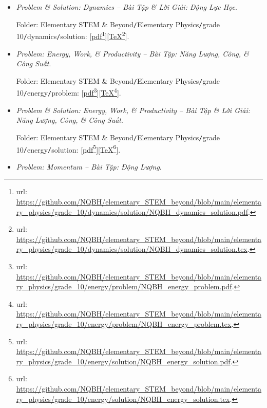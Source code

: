 \documentclass[12pt]{article}
\begin{document}
\begin{itemize}
	\item {\it Problem \& Solution: Dynamics -- Bài Tập \& Lời Giải: Động Lực Học}.
	
	Folder: {\sf Elementary STEM \& Beyond{\tt/}Elementary Physics{\tt/}grade 10{\tt/}dynamics{\tt/}solution}: [\href{https://github.com/NQBH/elementary_STEM_beyond/blob/main/elementary_physics/grade_10/dynamics/solution/NQBH_dynamics_solution.pdf}{pdf}\footnote{{\sc url}: \url{https://github.com/NQBH/elementary_STEM_beyond/blob/main/elementary_physics/grade_10/dynamics/solution/NQBH_dynamics_solution.pdf}.}][\href{https://github.com/NQBH/elementary_STEM_beyond/blob/main/elementary_physics/grade_10/dynamics/solution/NQBH_dynamics_solution.tex}{\TeX}\footnote{{\sc url}: \url{https://github.com/NQBH/elementary_STEM_beyond/blob/main/elementary_physics/grade_10/dynamics/solution/NQBH_dynamics_solution.tex}.}].
	\item {\it Problem: Energy, Work, \it\& Productivity -- Bài Tập: Năng Lượng, Công, {\it\&} Công Suất}.
	
	Folder: {\sf Elementary STEM \& Beyond{\tt/}Elementary Physics{\tt/}grade 10{\tt/}energy{\tt/}problem}: [\href{https://github.com/NQBH/elementary_STEM_beyond/blob/main/elementary_physics/grade_10/energy/problem/NQBH_energy_problem.pdf}{pdf}\footnote{{\sc url}: \url{https://github.com/NQBH/elementary_STEM_beyond/blob/main/elementary_physics/grade_10/energy/problem/NQBH_energy_problem.pdf}.}][\href{https://github.com/NQBH/elementary_STEM_beyond/blob/main/elementary_physics/grade_10/energy/problem/NQBH_energy_problem.tex}{\TeX}\footnote{{\sc url}: \url{https://github.com/NQBH/elementary_STEM_beyond/blob/main/elementary_physics/grade_10/energy/problem/NQBH_energy_problem.tex}.}].
	
	\item {\it Problem \& Solution: Energy, Work, \it\& Productivity -- Bài Tập \& Lời Giải: Năng Lượng, Công, {\it\&} Công Suất}.
	
	Folder: {\sf Elementary STEM \& Beyond{\tt/}Elementary Physics{\tt/}grade 10{\tt/}energy{\tt/}solution}: [\href{https://github.com/NQBH/elementary_STEM_beyond/blob/main/elementary_physics/grade_10/energy/solution/NQBH_energy_solution.pdf}{pdf}\footnote{{\sc url}: \url{https://github.com/NQBH/elementary_STEM_beyond/blob/main/elementary_physics/grade_10/energy/solution/NQBH_energy_solution.pdf}.}][\href{https://github.com/NQBH/elementary_STEM_beyond/blob/main/eleomentummentary_physics/grade_10/energy/solution/NQBH_energy_solution.tex}{\TeX}\footnote{{\sc url}: \url{https://github.com/NQBH/elementary_STEM_beyond/blob/main/elementary_physics/grade_10/energy/solution/NQBH_energy_solution.tex}.}].
	\item {\it Problem: Momentum -- Bài Tập: Động Lượng}.
	

\end{itemize}
\end{document}
